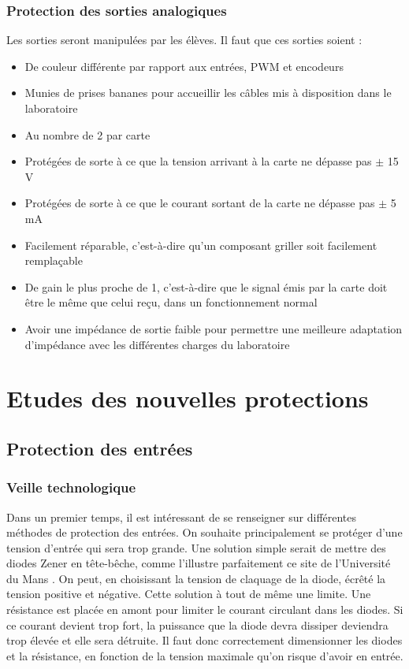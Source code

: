 \documentclass{report}
\begin{document}
\subsection{Protection des sorties analogiques}
Les sorties seront manipulées par les élèves. Il faut que ces sorties soient :
\begin{itemize}
\item De couleur différente par rapport aux entrées, PWM et encodeurs
\item Munies de prises bananes pour accueillir les câbles mis à disposition dans le laboratoire
\item Au nombre de 2 par carte
\item Protégées de sorte à ce que la tension arrivant à la carte ne dépasse pas $\pm$ 15 V
\item Protégées de sorte à ce que le courant sortant de la carte ne dépasse pas $\pm$ 5 mA
\item Facilement réparable, c'est-à-dire qu'un composant griller soit facilement remplaçable
\item De gain le plus proche de 1, c'est-à-dire que le signal émis par la carte doit être le même que celui reçu, dans un fonctionnement normal
\item Avoir une impédance de sortie faible pour permettre une meilleure adaptation d'impédance avec les différentes charges du laboratoire
\end{itemize}

\chapter{Etudes des nouvelles protections}
\thispagestyle{empty}
\section{Protection des entrées}
\subsection{Veille technologique}
Dans un premier temps, il est intéressant de se renseigner sur différentes méthodes de protection des entrées. On souhaite principalement se protéger d'une tension d'entrée qui sera trop grande. Une solution simple serait de mettre des diodes Zener en tête-bêche, comme l'illustre parfaitement ce site de l'Université du Mans \cite{Rousseau}. On peut, en choisissant la tension de claquage de la diode, écrêté la tension positive et négative. Cette solution à tout de même une limite. Une résistance est placée en amont pour limiter le courant circulant dans les diodes. Si ce courant devient trop fort, la puissance que la diode devra dissiper deviendra trop élevée et elle sera détruite. Il faut donc correctement dimensionner les diodes et la résistance, en fonction de la tension maximale qu'on risque d'avoir en entrée.
\end{document}
